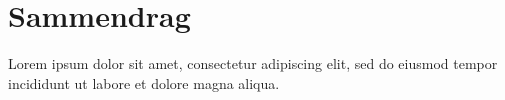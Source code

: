 \chapter*{Sammendrag}

Lorem ipsum dolor sit amet, consectetur adipiscing elit, sed do eiusmod tempor incididunt ut labore et dolore magna aliqua.